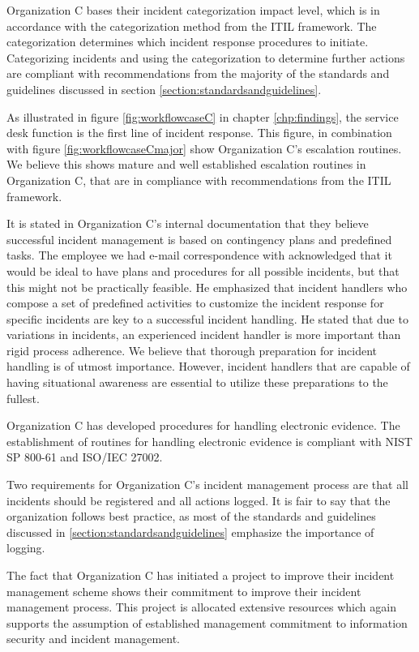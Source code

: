 Organization C bases their incident categorization impact level, which is in accordance with the categorization method from the ITIL framework. The categorization determines which incident response procedures to initiate. Categorizing incidents and using the categorization to determine further actions are compliant with recommendations from the majority of the standards and guidelines discussed in section \ref{section:standardsandguidelines}.

As illustrated in figure \ref{fig:workflowcaseC} in chapter \ref{chp:findings}, the service desk function is the first line of incident response. This figure, in combination with figure \ref{fig:workflowcaseCmajor} show Organization C's escalation routines. We believe this shows mature and well established escalation routines in Organization C, that are in compliance with recommendations from the ITIL framework.

It is stated in Organization C's internal documentation that they believe successful incident management is based on contingency plans and predefined tasks. The employee we had e-mail correspondence with acknowledged that it would be ideal to have plans and procedures for all possible incidents, but that this might not be practically feasible. He emphasized that incident handlers who compose a set of predefined activities to customize the incident response for specific incidents are key to a successful incident handling. He stated that due to variations in incidents, an experienced incident handler is more important than rigid process adherence. We believe that thorough preparation for incident handling is of utmost importance. However, incident handlers that are capable of having situational awareness are essential to utilize these preparations to the fullest. 

Organization C has developed procedures for handling electronic evidence. The establishment of routines for handling electronic evidence is compliant with NIST SP 800-61 and ISO/IEC 27002.

Two requirements for Organization C's incident management process are that all incidents should be registered and all actions logged. It is fair to say that the organization follows best practice, as most of the standards and guidelines discussed in \ref{section:standardsandguidelines} emphasize the importance of logging.

The fact that Organization C has initiated a project to improve their incident management scheme shows their commitment to improve their incident management process. This project is allocated extensive resources which again supports the assumption of established management commitment to information security and incident management.

